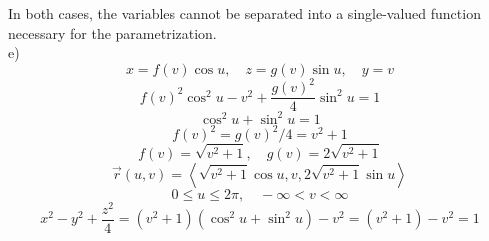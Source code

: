 \documentclass{report}
\begin{document}
{    In both cases, the variables cannot be separated into a single-valued function necessary for the parametrization. \\
    e) 
    \[ x = f(v) \cos u, \quad z = g(v) \sin u, \quad y = v \] 
    \[ f(v)^2 \cos^2 u - v^2 + \frac{g(v)^2}{4} \sin^2 u = 1 \] 
    \[ \cos^2 u + \sin^2 u = 1 \]
    \[ f(v)^2 = g(v)^2/4 = v^2 + 1 \] 
    \[ f(v) = \sqrt{v^2 + 1}, \quad g(v) = 2\sqrt{v^2 + 1} \] 
    \[
    \vec{r}(u, v) = \left\langle \sqrt{v^2 + 1} \cos u, v, 2\sqrt{v^2 + 1} \sin u \right\rangle \] 
    \[ 0 \leq u \leq 2\pi, \quad -\infty < v < \infty \]
    \[ x^2 - y^2 + \frac{z^2}{4} = (v^2 + 1)(\cos^2 u + \sin^2 u) - v^2 = (v^2 + 1) - v^2 = 1 \] 

}

\newpage


\end{document}
